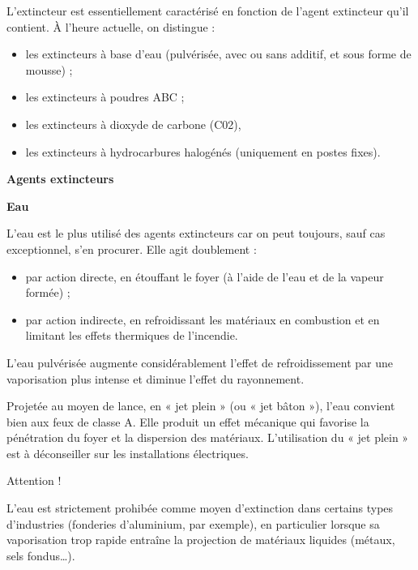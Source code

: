\vspace{0.3cm}


L’extincteur est essentiellement caractérisé en fonction de l’agent extincteur qu’il contient. À l’heure actuelle, on distingue :
\begin{itemize}
\item  les extincteurs à base d’eau (pulvérisée, avec ou sans additif, et sous forme de mousse) ;
\item  les extincteurs à poudres ABC ;
\item  les extincteurs à dioxyde de carbone (C02),
\item  les extincteurs à hydrocarbures halogénés (uniquement en postes fixes).

\end{itemize}

\vspace{0.3cm}
\textbf{Agents extincteurs}
\vspace{0.3cm}

\textbf{Eau}
\vspace{0.3cm} 

L’eau est le plus utilisé des agents extincteurs car on peut toujours, sauf cas exceptionnel, s’en procurer. Elle agit doublement :

\begin{itemize}

\item  par action directe, en étouffant le foyer (à l’aide de l’eau et de la vapeur formée) ;
\item  par action indirecte, en refroidissant les matériaux en combustion et en limitant les effets thermiques de l’incendie.

\end{itemize}

L’eau pulvérisée augmente considérablement l’effet de refroidissement par une vaporisation plus intense et diminue l’effet du rayonnement.
\vspace{0.3cm}

Projetée au moyen de lance, en « jet plein » (ou « jet bâton »), l’eau convient bien aux feux de classe A. Elle produit un effet mécanique qui favorise la pénétration du foyer et la dispersion des matériaux. L’utilisation du « jet plein » est à déconseiller sur les installations électriques.

Attention !
\vspace{0.3cm}

L’eau est strictement prohibée comme moyen d’extinction dans certains types d’industries (fonderies d’aluminium, par exemple), en particulier lorsque sa vaporisation trop rapide entraîne la projection de matériaux liquides (métaux, sels fondus…).


